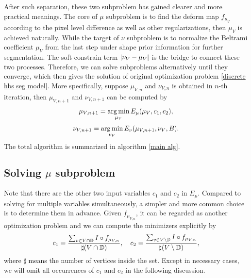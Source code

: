 \documentclass[review,onefignum,onetabnum]{siamonline190516}
\begin{document}
After such separation, these two subproblem has gained clearer and more practical meanings. The core of $\mu$ subproblem is to find the deform map $f_{\mu_V}$ according to the pixel level difference as well as other regularizations, then $\mu_V$ is achieved naturally. While the target of $\nu$ subproblem is to normalize the Beltrami coefficient $\mu_V$ from the last step under shape prior information for further segmentation. The soft constrain term $\left\vert \nu_V - \mu_V \right\vert$ is the bridge to connect these two processes. Therefore, we can solve subproblems alternatively until they converge, which then gives the solution of original optimization problem \ref{discrete hbs seg model}. More specifically, suppose $\mu_{V,n}$ and $\nu_{V,n}$ is obtained in $n$-th iteration, then $\mu_{V,n+1}$ and $\nu_{V,n+1}$ can be computed by
\begin{equation}
    \mu_{V,n+1} = \mathop{\arg\min}_{\mu_V} E_\mu(\mu_V, c_1, c_2),
\end{equation}
\begin{equation}
    \nu_{V,n+1} = \mathop{\arg\min}_{\nu_V} E_\nu(\mu_{V,n+1},\nu_V, B).
\end{equation}
The total algorithm is summarized in algorithm \ref{main alg}.

\subsection{Solving $\mu$ subproblem}
Note that there are the other two input variables $c_1$ and $c_2$ in $E_\mu$. Compared to solving for multiple variables simultaneously, a simpler and more common choice is to determine them in advance. Given $f_{\mu_{V,n}}$, it can be regarded as another optimization problem and we can compute the minimizers explicitly by
\begin{equation}\label{mu c1 c2}
    c_1 = \frac{\sum_{v \in V \cap \D} I \circ f_{\mu_{V,n}}}{\sharp (V \cap \D)}, \quad
    c_2 = \frac{\sum_{v \in V \setminus \D} I \circ f_{\mu_{V,n}}}{\sharp (V \setminus \D)},
\end{equation}
where $\sharp$ means the number of vertices inside the set. Except in necessary cases, we will omit all occurrences of $c_1$ and $c_2$ in the following discussion.
\end{document}
